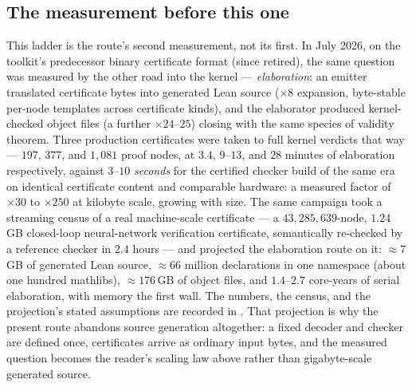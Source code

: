 \begin{table}[htbp]
\centering\footnotesize

\caption{The admission gate. Predictions apply the fitted law to each
species' certificate sizes in sealed-container bytes (census rows
stated in committed-artifact bytes carry the measured container
overhead as a declared correction); beyond the fitted range
($\approx 25$\,KB) they are
extrapolations --- one-sidedly corroborated by the budget-censored
rungs up to $126$\,KB, order-of-magnitude statements past that.
``Fragment'' marks measured membership only for the ladder's own
species; \emph{untested} species settle theirs with a one-instance
probe before any batch attempt.}
\label{tab:lean-route-admission}
\end{table}

\subsection{The measurement before this one}
\label{sec:exp-lean-route-history}

This ladder is the route's second measurement, not its first. In July
2026, on the toolkit's predecessor binary certificate format (since
retired), the same question was measured by the other road into the
kernel --- \emph{elaboration}: an emitter translated certificate bytes
into generated Lean source ($\times 8$ expansion, byte-stable per-node
templates across certificate kinds), and the elaborator produced
kernel-checked object files (a further $\times 24$--$25$) closing with
the same species of validity theorem. Three production certificates
were taken to full kernel verdicts that way --- $197$, $377$, and
$1{,}081$ proof nodes, at $3.4$, $9$--$13$, and $28$ minutes of
elaboration respectively, against $3$--$10$ \emph{seconds} for the
certified checker build of the same era on identical certificate
content and comparable hardware: a measured factor of $\times 30$ to
$\times 250$ at kilobyte scale, growing with size. The same campaign
took a streaming census of a real machine-scale certificate --- a
$43{,}285{,}639$-node, $1.24$\,GB closed-loop neural-network
verification certificate, semantically re-checked by a reference
checker in $2.4$ hours --- and projected the elaboration route on it:
$\approx 7$\,GB of generated Lean source, $\approx 66$ million
declarations in one namespace (about one hundred mathlibs),
$\approx 176$\,GB of object files, and $1.4$--$2.7$ core-years of
serial elaboration, with memory the first wall. The numbers, the
census, and the projection's stated assumptions are recorded in
. That projection is why the present route
abandons source generation altogether: a fixed decoder and checker are
defined once, certificates arrive as ordinary input bytes, and the
measured question becomes the reader's scaling law above rather than
gigabyte-scale generated source.

